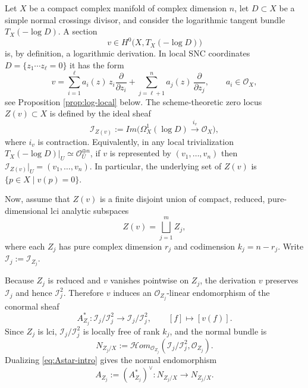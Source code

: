 \documentclass[12pt,a4paper,dvipsnames,x11names]{amsart}
\numberwithin{equation}{section}
\theoremstyle{plain}
\theoremstyle{definition}
\theoremstyle{remark}
\newcommand{\II}{\mathscr I}
\newcommand{\OO}{\mathscr O}
\begin{document}
Let $X$ be a compact complex manifold of complex dimension $n$, let $D\subset X$ be a simple normal crossings divisor, and consider the logarithmic tangent bundle $T_X(-\log D)$. A section
$$
v\in H^0\bigl(X,T_X(-\log D)\bigr)
$$
is, by definition, a logarithmic derivation. In local SNC coordinates
$D=\{z_1\cdots z_\ell=0\}$ it has the form
\begin{equation}\label{eq:local-log-v-intro}
v=\sum_{i=1}^{\ell} a_i(z)\,z_i\frac{\partial}{\partial z_i}+\sum_{j=\ell+1}^{n} a_j(z)\,\frac{\partial}{\partial z_j},
\qquad a_i\in \OO_X,
\end{equation}
see Proposition \ref{prop:log-local} below.
The scheme-theoretic zero locus $Z(v)\subset X$ is defined by the ideal sheaf
\begin{equation}\label{eq:zero-ideal}
\II_{Z(v)}:=Im\Big(\Omega_X^1(\log D)\xrightarrow{ i_v }\OO_X\Big),
\end{equation}
where $i_v$ is contraction. Equivalently, in any local trivialization
$T_X(-\log D)|_U\simeq \OO_U^{\oplus n}$, if $v$ is represented by $(v_1,\dots,v_n)$ then $\II_{Z(v)}|_U=(v_1,\dots,v_n)$. In particular, the underlying set of $Z(v)$ is $\{p\in X\mid v(p)=0\}$.

Now, assume that $Z(v)$ is a finite disjoint union of compact, reduced, pure-dimensional lci analytic subspaces
\begin{equation}\label{eq:Zdecomp}
Z(v)=\bigsqcup_{j=1}^m Z_j,
\end{equation}
where each $Z_j$ has pure complex dimension $r_j$ and codimension $k_j=n-r_j$. Write $\II_j:=\II_{Z_j}$.

Because $Z_j$ is reduced and $v$ vanishes pointwise on $Z_j$, the derivation $v$ preserves $\II_j$ and hence $\II_j^2$. Therefore $v$ induces an $\OO_{Z_j}$-linear endomorphism of the conormal sheaf
\begin{equation}\label{eq:Astar-intro}
A_{Z_j}^*:\II_j/\II_j^2\longrightarrow \II_j/\II_j^2,
\qquad [f]\longmapsto [v(f)].
\end{equation}
Since $Z_j$ is lci, $\II_j/\II_j^2$ is locally free of rank $k_j$, and the normal bundle is
\begin{equation}\label{eq:normal-intro}
N_{Z_j/X}:= \mathscr{H}om_{\OO_{Z_j}}(\II_j/\II_j^2,\OO_{Z_j}).
\end{equation}
Dualizing \eqref{eq:Astar-intro} gives the normal endomorphism
\begin{equation}\label{eq:A-intro}
A_{Z_j}:=(A_{Z_j}^*)^\vee:N_{Z_j/X}\longrightarrow N_{Z_j/X}.
\end{equation}
\end{document}
